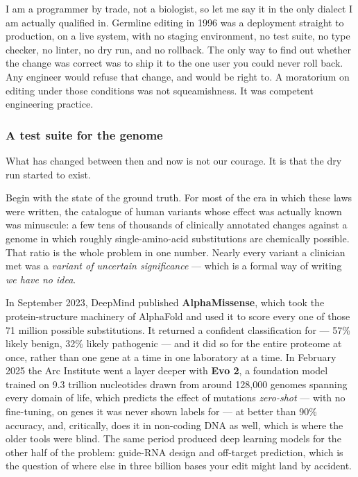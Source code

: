 I am a programmer by trade, not a biologist, so let me say it in the only dialect I am actually
qualified in. Germline editing in 1996 was a deployment straight to production, on a live system,
with no staging environment, no test suite, no type checker, no linter, no dry run, and no rollback.
The only way to find out whether the change was correct was to ship it to the one user you could
never roll back. Any engineer would refuse that change, and would be right to. A moratorium on
editing under those conditions was not squeamishness. It was competent engineering practice.

\subsubsection*{A test suite for the genome}

What has changed between then and now is not our courage. It is that the dry run started to exist.

Begin with the state of the ground truth. For most of the era in which these laws were written, the
catalogue of human variants whose effect was actually known was minuscule: a few tens of thousands
of clinically annotated changes against a genome in which roughly  single-amino-acid
substitutions are chemically possible. That ratio is the whole problem in one number. Nearly every
variant a clinician met was a \emph{variant of uncertain significance} --- which is a formal way of
writing \emph{we have no idea}.

In September 2023, DeepMind published \textbf{AlphaMissense}, which took the protein-structure
machinery of AlphaFold and used it to score every one of those 71 million possible substitutions. It
returned a confident classification for  --- 57\% likely benign, 32\% likely
pathogenic --- and it did so for the entire proteome at once, rather than one gene at a time in one
laboratory at a time. In February 2025 the Arc Institute went a layer deeper with \textbf{Evo 2}, a
foundation model trained on 9.3 trillion nucleotides drawn from around 128,000 genomes spanning every
domain of life, which predicts the effect of mutations \emph{zero-shot} --- with no fine-tuning, on
genes it was never shown labels for --- at better than 90\% accuracy, and, critically, does it in
non-coding DNA as well, which is where the older tools were blind. The same period produced deep
learning models for the other half of the problem: guide-RNA design and off-target prediction, which
is the question of where else in three billion bases your edit might land by accident.


